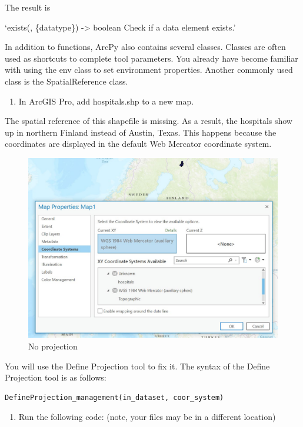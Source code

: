 \documentclass[]{article}
\providecommand{\tightlist}{%
  \setlength{\itemsep}{0pt}\setlength{\parskip}{0pt}}
\begin{document}
The result is

`exists(, \{datatype\}) -\textgreater{} boolean Check if a data element
exists.'

In addition to functions, ArcPy also contains several classes. Classes
are often used as shortcuts to complete tool parameters. You already
have become familiar with using the env class to set environment
properties. Another commonly used class is the SpatialReference class.

\begin{enumerate}
\def\labelenumi{\arabic{enumi}.}
\setcounter{enumi}{4}
\tightlist
\item
  In ArcGIS Pro, add hospitals.shp to a new map.
\end{enumerate}

The spatial reference of this shapefile is missing. As a result, the
hospitals show up in northern Finland instead of Austin, Texas. This
happens because the coordinates are displayed in the default Web
Mercator coordinate system.

\begin{figure}
\centering
\includegraphics{./labs/images/lab02_noproj.png}
\caption{No projection}
\end{figure}

You will use the Define Projection tool to fix it. The syntax of the
Define Projection tool is as follows:

\begin{verbatim}
DefineProjection_management(in_dataset, coor_system)
\end{verbatim}

\begin{enumerate}
\def\labelenumi{\arabic{enumi}.}
\setcounter{enumi}{5}
\tightlist
\item
  Run the following code: (note, your files may be in a different
  location)
\end{enumerate}
\end{document}

